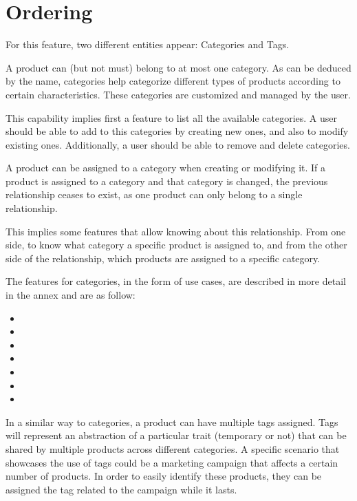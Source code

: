 \section{Ordering}
For this feature, two different entities appear: Categories and Tags. 

A product can (but not must) belong to at most one category. As can be deduced by the name, categories help categorize different types of products according to certain characteristics. These categories are customized and managed by the user.

This capability implies first a feature to list all the available categories. A user should be able to add to this categories by creating new ones, and also to modify existing ones. Additionally, a user should be able to remove and delete categories.

A product can be assigned to a category when creating or modifying it. If a product is assigned to a category and that category is changed, the previous relationship ceases to exist, as one product can only belong to a single relationship. 

This implies some features that allow knowing about this relationship. From one side, to know what category a specific product is assigned to, and from the other side of the relationship, which products are assigned to a specific category.

The features for categories, in the form of use cases, are described in more detail in the annex and are as follow:
\hfill\break
\begin{itemize}
\item {}
\item {}
\item {}
\item {}
\item {}
\item {}
\item {}
\end{itemize}
\hfill\break
In a similar way to categories, a product can have multiple tags assigned. Tags will represent an abstraction of a particular trait (temporary or not) that can be shared by multiple products across different categories. A specific scenario that showcases the use of tags could be a marketing campaign that affects a certain number of products. In order to easily identify these products, they can be assigned the tag related to the campaign while it lasts.

